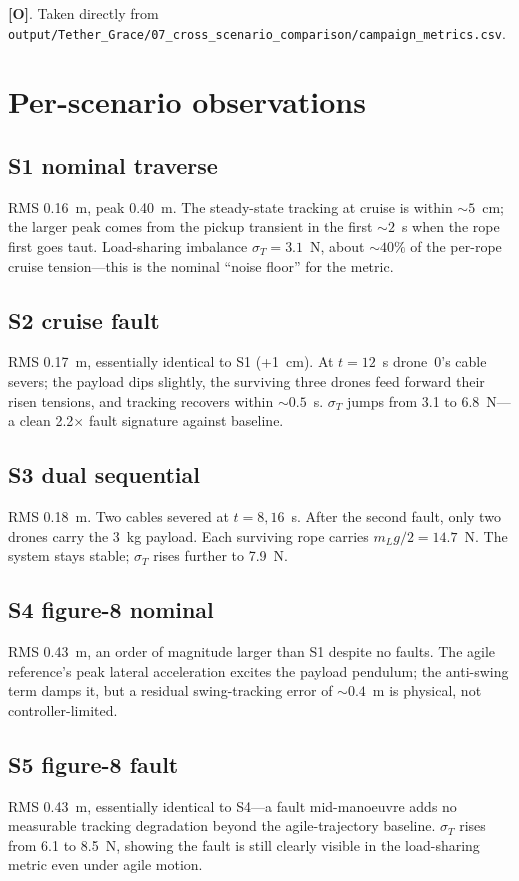 \documentclass[11pt,a4paper,oneside]{report}
\newcommand{\Obs}{\textcolor{green!50!black}{\textbf{[O]}}}
\begin{document}
\Obs. Taken directly from
\texttt{output/Tether\_Grace/07\_cross\_scenario\_comparison/\-campaign\_metrics.csv}.

\section{Per-scenario observations}

\subsection{S1 nominal traverse}
RMS 0.16~m, peak 0.40~m. The steady-state tracking at cruise is
within $\sim 5$~cm; the larger peak comes from the pickup transient
in the first $\sim 2$~s when the rope first goes taut. Load-sharing
imbalance $\sigma_T=3.1$~N, about $\sim 40\%$ of the per-rope cruise
tension---this is the nominal ``noise floor'' for the metric.

\subsection{S2 cruise fault}
RMS 0.17~m, essentially identical to S1 (+1~cm). At $t=12$~s
drone~0's cable severs; the payload dips slightly, the surviving
three drones feed forward their risen tensions, and tracking
recovers within $\sim 0.5$~s. $\sigma_T$ jumps from 3.1 to 6.8~N---
a clean 2.2$\times$ fault signature against baseline.

\subsection{S3 dual sequential}
RMS 0.18~m. Two cables severed at $t=8,16$~s. After the second
fault, only two drones carry the 3~kg payload. Each surviving rope
carries $m_L g/2 = 14.7$~N. The system stays stable; $\sigma_T$ rises
further to 7.9~N.

\subsection{S4 figure-8 nominal}
RMS 0.43~m, an order of magnitude larger than S1 despite no faults.
The agile reference's peak lateral acceleration excites the payload
pendulum; the anti-swing term damps it, but a residual swing-tracking
error of $\sim 0.4$~m is physical, not controller-limited.

\subsection{S5 figure-8 fault}
RMS 0.43~m, essentially identical to S4---a fault mid-manoeuvre adds
no measurable tracking degradation beyond the agile-trajectory
baseline. $\sigma_T$ rises from 6.1 to 8.5~N, showing the fault is
still clearly visible in the load-sharing metric even under
agile motion.
\end{document}
